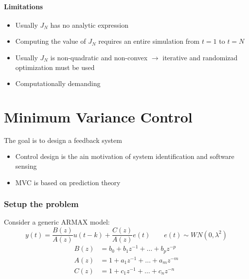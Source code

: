 \documentclass{article}
\let\OldPart\part
\renewcommand{\part}{\newpage\OldPart}
\begin{document}
\subsection{Limitations}
\begin{itemize}
\item Usually $J_N$ has no analytic expression
\item Computing the value of $J_N$ requires an entire simulation from $t=1$ to $t=N$
\item Usually $J_N$ is non-quadratic and non-convex $\rightarrow$ iterative and randomizad optimization must be used
\item Computationally demanding
\end{itemize}
\begin{center}
\end{center}

\part{Minimum Variance Control}
The goal is to design a feedback system
\begin{itemize}
\item Control design is the ain motivation of system identification and software sensing
\item MVC is based on prediction theory
\end{itemize}
\section{Setup the problem}
Consider a generic ARMAX model:
\[
y(t)=\frac{B(z)}{A(z)}u(t-k)
+\frac{C(z)}{A(z)}e(t)
\qquad
e(t)\sim WN(0,\lambda^2)
\]
\begin{align*}
B(z)&=b_0+b_1z^{-1}+\dots+b_pz^{-p}\\
A(z)&=1+a_1z^{-1}+\dots+a_mz^{-m}\\
C(z)&=1+c_1z^{-1}+\dots+c_nz^{-n}
\end{align*}
\end{document}
